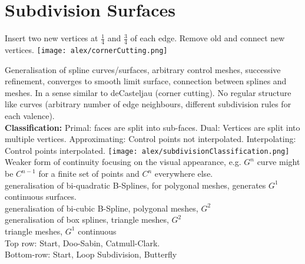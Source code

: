 \section{Subdivision Surfaces}

 Insert two new vertices at $\frac{1}{4}$ and $\frac{3}{4}$ of each edge. Remove old and connect new vertices.
\texttt{[image: alex/cornerCutting.png]}

 Generalisation of spline curves/surfaces, arbitrary control meshes, successive refinement, converges to smooth limit surface, connection between splines and meshes. In a sense similar to deCasteljau (corner cutting). No regular structure like curves (arbitrary number of edge neighbours, different subdivision rules for each valence). \\
\textbf{Classification:} Primal: faces are split into sub-faces. Dual: Vertices are split into multiple vertices. Approximating: Control points not interpolated. Interpolating: Control points interpolated.
\texttt{[image: alex/subdivisionClassification.png]}
  Weaker form of continuity focusing on the visual appearance, e.g. $G^n$ curve might be $C^{n-1}$ for a finite set of points and $C^n$ everywhere else.\\
generalisation of bi-quadratic B-Splines, for polygonal meshes, generates $G^1$ continuous surfaces.\\
  generalisation of bi-cubic B-Spline, polygonal meshes, $G^2$\\
 generalisation of box splines, triangle meshes, $G^2$\\
 triangle meshes, $G^1$ continuous\\
Top row: Start, Doo-Sabin, Catmull-Clark. \\
Bottom-row: Start, Loop Subdivision, Butterfly \\
